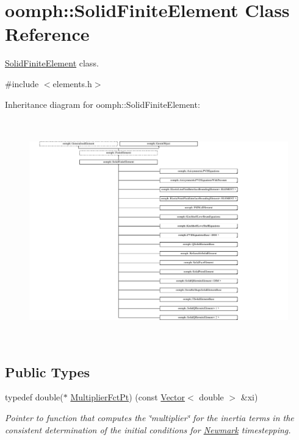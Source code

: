 \hypertarget{classoomph_1_1SolidFiniteElement}{}\section{oomph\+:\+:Solid\+Finite\+Element Class Reference}
\label{classoomph_1_1SolidFiniteElement}


\hyperlink{classoomph_1_1SolidFiniteElement}{Solid\+Finite\+Element} class.  




{\ttfamily \#include $<$elements.\+h$>$}

Inheritance diagram for oomph\+:\+:Solid\+Finite\+Element\+:\begin{figure}[H]
\begin{center}
\leavevmode
\includegraphics[height=9.696970cm]{classoomph_1_1SolidFiniteElement}
\end{center}
\end{figure}
\subsection*{Public Types}
\begin{DoxyCompactItemize}
\item 
typedef double($\ast$ \hyperlink{classoomph_1_1SolidFiniteElement_a1ec1cdf98041a51f77aab2b892856fc4}{Multiplier\+Fct\+Pt}) (const \hyperlink{classoomph_1_1Vector}{Vector}$<$ double $>$ \&xi)
\begin{DoxyCompactList}\small\item\em Pointer to function that computes the \char`\"{}multiplier\char`\"{} for the inertia terms in the consistent determination of the initial conditions for \hyperlink{classoomph_1_1Newmark}{Newmark} timestepping. \end{DoxyCompactList}\end{DoxyCompactItemize}
